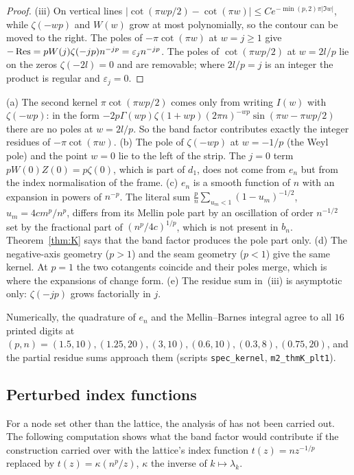 \begin{proof}
(iii) On vertical lines $|\cot(\pi wp/2)-\cot(\pi w)|\le Ce^{-\min(p,2)\pi|\Im w|}$, while $\zeta(-wp)$ and $W(w)$ grow at
most polynomially, so the contour can be moved to the right. The poles of $-\pi\cot(\pi w)$ at $w=j\ge1$ give
$-\operatorname{Res}=pW(j)\zeta(-jp)n^{-jp}=\varepsilon_jn^{-jp}$. The poles of $\cot(\pi wp/2)$ at $w=2l/p$ lie on the zeros
$\zeta(-2l)=0$ and are removable; where $2l/p=j$ is an integer the product is regular and $\varepsilon_j=0$.
\end{proof}

\begin{remark}\label{rem:K}
(a) The second kernel $\pi\cot(\pi wp/2)$ comes only from writing $I(w)$ with $\zeta(-wp)$: in the form
$-2p\Gamma(wp)\zeta(1+wp)(2\pi n)^{-wp}\sin(\pi w-\pi wp/2)$ there are no poles at $w=2l/p$. So the band factor contributes
exactly the integer residues of $-\pi\cot(\pi w)$.
(b) The pole of $\zeta(-wp)$ at $w=-1/p$ (the Weyl pole) and the point $w=0$ lie to the left of the strip. The $j=0$ term
$pW(0)Z(0)=p\zeta(0)$, which is part of $d_1$, does not come from $e_n$ but from the index normalisation of the
frame.
(c) $e_n$ is a smooth function of $n$ with an expansion in powers of $n^{-p}$. The literal sum
$\frac pn\sum_{u_m<1}(1-u_m)^{-1/2}$, $u_m=4cm^p/n^p$, differs from its Mellin pole part by an oscillation of order
$n^{-1/2}$ set by the fractional part of $(n^p/4c)^{1/p}$, which is not present in $b_n$. Theorem~\ref{thm:K} says that
the band factor produces the pole part only.
(d) The negative-axis geometry ($p>1$) and the seam geometry ($p<1$) give the same kernel. At $p=1$ the two cotangents
coincide and their poles merge, which is where the expansions of \cite{PaperII} change form.
(e) The residue sum in~(iii) is asymptotic only: $\zeta(-jp)$ grows factorially in $j$.
\end{remark}

Numerically, the quadrature of $e_n$ and the Mellin--Barnes integral agree to all $16$ printed digits at
$(p,n)=(1.5,10),(1.25,20),(3,10),(0.6,10),(0.3,8),(0.75,20)$, and the partial residue sums approach them (scripts
\texttt{spec\_kernel}, \texttt{m2\_thmK\_plt1}).

\subsection{Perturbed index functions}\label{sec:perturbed}
For a node set other than the lattice, the analysis of \cite{PaperII} has not been carried out. The following
computation shows what the band factor would contribute if the construction carried over with the lattice's index
function $t(z)=nz^{-1/p}$ replaced by $t(z)=\kappa(n^p/z)$, $\kappa$ the inverse of $k\mapsto\lambda_k$.

